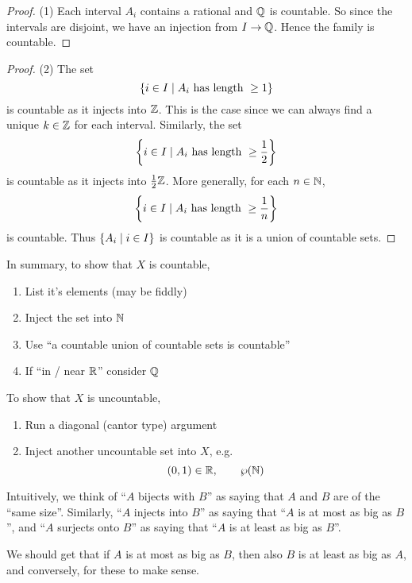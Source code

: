 \documentclass{article}
\begin{document}
\begin{proof} (1)
    Each interval $A_i$ contains a rational and $\mathbb{Q}$ is countable.
    So since the intervals are disjoint, we have an injection from $I \rightarrow \mathbb{Q}$.
    Hence the family is countable.
\end{proof}
\begin{proof} (2)
    The set 
    \[
        \left\{ i \in I \mid A_i \text{ has length } \geq 1 \right\}  
    \]
    is countable as it injects into $\mathbb{Z}$.
    This is the case since we can always find a unique $k \in \mathbb{Z}$ for each interval.
    Similarly, the set
    \[
        \left\{ i \in I \mid A_i \text{ has length } \geq \frac{1}{2} \right\}
    \]
    is countable as it injects into $\frac{1}{2}\mathbb{Z}$. 
    More generally, for each $n \in \mathbb{N}$,
    \[
        \left\{ i \in I \mid A_i \text{ has length } \geq \frac{1}{n} \right\}
    \]
    is countable. 
    Thus $\left\{ A_i \mid i \in I \right\}$ is countable as it is a union of countable sets.
\end{proof}
In summary, to show that $X$ is countable,
\begin{enumerate}[label=(\arabic*)]
    \item List it's elements (may be fiddly)
    \item Inject the set into $\mathbb{N}$
    \item Use ``a countable union of countable sets is countable''
    \item If ``in / near $\mathbb{R}$'' consider $\mathbb{Q}$
\end{enumerate}
To show that $X$ is uncountable,
\begin{enumerate}[label=(\arabic*)]
    \item Run a diagonal (cantor type) argument
    \item Inject another uncountable set into $X$, e.g.
    \[
        (0, 1) \in \mathbb{R}, \qquad \wp(\mathbb{N})
    \]
\end{enumerate}
Intuitively, we think of ``$A$ bijects with $B$'' as saying that $A$ and $B$ are of the ``same size''.
Similarly, ``$A$ injects into $B$'' as saying that ``$A$ is at most as big as $B$'',
and ``$A$ surjects onto $B$'' as saying that ``$A$ is at least as big as $B$''.

We should get that if $A$ is at most as big as $B$, then also $B$ is at least as big as $A$, and conversely, for these to make sense.
\end{document}
